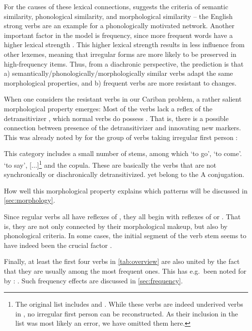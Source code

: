 For the causes of these lexical connections, \textcite[118]{bybee1985morphology} suggests the criteria of semantic similarity, phonological similarity, and morphological similarity -- the English strong verbs are an example for a phonologically motivated network.
Another important factor in the model is frequency, since more frequent words have a higher lexical strength \parencite[119]{bybee1985morphology}.
This higher lexical strength results in less influence from other lexemes, meaning that irregular forms are more likely to be preserved in high-frequency items.
Thus, from a diachronic perspective, the prediction is that a) semantically\slash{}phonologically\slash\hspace{0pt}morphologically similar verbs adapt the same morphological properties, and b) frequent verbs are more resistant to changes.

When one considers the resistant verbs in our Cariban problem, a rather salient morphological property emerges:
Most of the verbs lack a reflex of the detransitivizer \detrz, which normal  verbs do possess .
That is, there is a possible connection between presence of the detransitivizer and innovating new  markers.
This was already noted by \textcite{meira1998proto} for the group of \PTar verbs taking irregular first person :
\begin{quotebox}{\parencite[112]{meira1998proto}}
	This category includes a small number of stems, among which ‘to go’, ‘to come’. ‘to say’, [...]\footnote{The original list includes  and . While these verbs are indeed underived  verbs in \trio, no irregular first person  can be reconstructed. As their inclusion in the list was most likely an error, we have omitted them here.} and the copula. These are basically the verbs that are not synchronically or diachronically detransitivized. yet belong to the A conjugation.
\end{quotebox} %
How well this morphological property explains which patterns will be discussed in \cref{sec:morphology}.

Since regular  verbs all have reflexes of \detrz, they all begin with reflexes of  or .
That is, they are not only connected by their morphological makeup, but also by phonological criteria.
In some cases, the initial segment of the verb stem seems to have indeed been the crucial factor .

Finally, at least the first four verbs in \cref{tab:overview} are also united by the fact that they are usually among the most frequent ones.
This has e.g.\ been noted for \kalina by \textcite[75]{courtz2008carib}: .
Such frequency effects are discussed in \cref{sec:frequency}.

